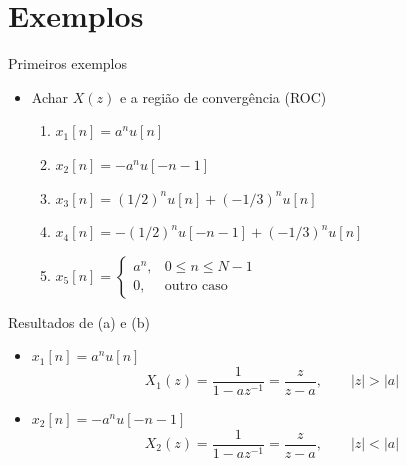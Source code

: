 \section[slide=true]{Exemplos}
\begin{slide}{Primeiros exemplos}
   \begin{itemize}
      \item Achar $X(z)$ e a região de convergência (ROC)
      \begin{enumerate}
         \item[a)] $x_1[n] = a^nu[n]$
         \item[b)] $x_2[n] = -a^nu[-n-1]$
         \item[c)] $x_3[n] = (1/2)^nu[n]+(-1/3)^nu[n]$
         \item[d)] $x_4[n] = -(1/2)^nu[-n-1]+(-1/3)^nu[n]$
         \item[e)] $x_5[n]=\begin{cases}a^n, & 0\leq n \leq N-1\\0, & \text{outro caso} \end{cases}$
      \end{enumerate}
    \end{itemize}
\end{slide}

\begin{slide}{Resultados de (a) e (b)}
   \begin{itemize}
      \item $x_1[n] = a^nu[n]$
      \begin{equation*}
          X_1(z) = \frac{1}{1-az^{-1}} = \frac{z}{z-a}, \qquad |z|>|a|
      \end{equation*}
      \pause
      \item $x_2[n] = -a^nu[-n-1]$
      \begin{equation*}
          X_2(z) = \frac{1}{1-az^{-1}} = \frac{z}{z-a}, \qquad |z|<|a|
      \end{equation*}
   \end{itemize}
\end{slide}

